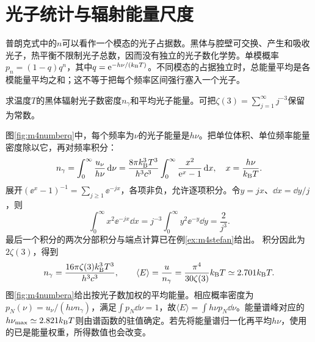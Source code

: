 \section{光子统计与辐射能量尺度}
普朗克式中的$n$可以看作一个模态的光子占据数。黑体与腔壁可交换、产生和吸收光子，热平衡不限制光子总数，因而没有独立的光子数化学势。单模概率$p_n=(1-q)q^n$，其中$q=\mathrm e^{-h\nu/(k_{\mathrm B} T)}$。不同模态的占据独立时，总能量平均是各模能量平均之和；这不等于把每个频率区间强行塞入一个光子。

\begin{example}\label{ex:m4photonnumber}
求温度$T$的黑体辐射光子数密度$n_\gamma$和平均光子能量。可把$\zeta(3)=\sum_{j=1}^\infty j^{-3}$保留为常数。
\end{example}
\begin{solution}
图\ref{fig:m4numberq}中，每个频率为$\nu$的光子能量是$h\nu$。把单位体积、单位频率能量密度除以它，再对频率积分：
\[
 n_\gamma=\int_0^\infty\frac{u_\nu}{h\nu}\mathop{}\!\mathrm d\nu
 =\frac{8\pi k_{\mathrm B}^3T^3}{h^3c^3}
 \int_0^\infty\frac{x^2}{\mathrm e^x-1}\mathop{}\!\mathrm d x,
 \quad x=\frac{h\nu}{k_{\mathrm B} T}.
\]
展开$(\ee^x-1)^{-1}=\sum_{j\geq1}\ee^{-jx}$，各项非负，允许逐项积分。令$y=jx$、$\dd x=\dd y/j$，则
\[
 \int_0^\infty x^2\ee^{-jx}\dd x
 =j^{-3}\int_0^\infty y^2\ee^{-y}\dd y=\frac2{j^3}.
\]
最后一个积分的两次分部积分与端点计算已在例\ref{ex:m4stefan}给出。
积分因此为$2\zeta(3)$，得到
\[
 n_\gamma=\frac{16\pi\zeta(3)k_{\mathrm B}^3T^3}{h^3c^3},\qquad
 \langle E\rangle=\frac{u}{n_\gamma}
 =\frac{\pi^4}{30\zeta(3)}k_{\mathrm B} T\simeq2.701k_{\mathrm B} T.
\]
图\ref{fig:m4numbera}给出按光子数加权的平均能量。相应概率密度为$p_N(\nu)=u_\nu/(h\nu n_\gamma)$，满足$\int p_N\dd\nu=1$，故$\langle E\rangle=\int h\nu p_N\dd\nu$。能量谱峰对应的$h\nu_{\max}\simeq2.821k_{\mathrm B} T$则由谱函数的驻值确定。若先将能量谱归一化再平均$h\nu$，使用的已是能量权重，所得数值也会改变。
\end{solution}

